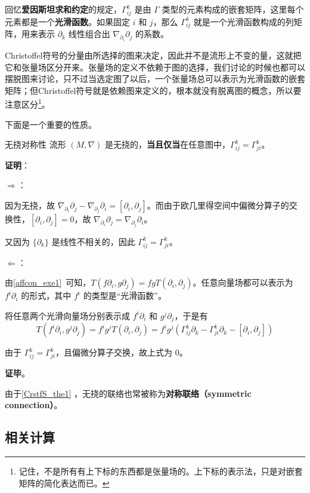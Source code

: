 回忆\textbf{爱因斯坦求和约定}的规定，$\Gamma^k_{ij}$ 是由 $\Gamma$ 类型的元素构成的嵌套矩阵，这里每个元素都是一个\textbf{光滑函数}。如果固定 $i$ 和 $j$，那么 $\Gamma^k_{ij}$ 就是一个光滑函数构成的列矩阵，用来表示 $\partial_k$ 线性组合出 $\nabla_{\partial_i}\partial_j$ 的系数。

Christoffel符号的分量由所选择的图来决定，因此并不是流形上不变的量，这就把它和张量场区分开来。张量场的定义不依赖于图的选择，我们讨论的时候也都可以摆脱图来讨论，只不过当选定图了以后，一个张量场总可以表示为光滑函数的嵌套矩阵；但Christoffel符号就是依赖图来定义的，根本就没有脱离图的概念，所以要注意区分\footnote{记住，不是所有有上下标的东西都是张量场的。上下标的表示法，只是对嵌套矩阵的简化表达而已。}。


下面是一个重要的性质。

\begin{theorem}{无挠对称性}\label{CrstfS_the1}
流形 $(M, \nabla)$ 是无挠的，\textbf{当且仅当}在任意图中，$\Gamma^k_{ij}=\Gamma^k_{ji}$。
\end{theorem}

\textbf{证明}：

$\Rightarrow$：

因为无挠，故 $\nabla_{\partial_i}\partial_j-\nabla_{\partial_j}\partial_i=[\partial_i, \partial_j]$。而由于欧几里得空间中偏微分算子的交换性，$[\partial_i, \partial_j]=0$，故 $\nabla_{\partial_i}\partial_j=\nabla_{\partial_j}\partial_i$。

又因为 $\{\partial_k\}$ 是线性不相关的，因此 $\Gamma^k_{ij}=\Gamma^k_{ji}$。

$\Leftarrow$：

由\autoref{affcon_exe1}~可知，$T(f\partial_i, g\partial_j)=fgT(\partial_i, \partial_j)$。任意向量场都可以表示为 $f^i\partial_i$ 的形式，其中 $f^i$ 的类型是“光滑函数”。

将任意两个光滑向量场分别表示成 $f^i\partial_i$ 和 $g^j\partial_j$，于是有
\begin{equation}
T(f^i\partial_i, g^j\partial_j)=f^ig^jT(\partial_i, \partial_j)=f^ig^j(\Gamma^k_{ij}\partial_k-\Gamma^k_{ji}\partial_k-[\partial_i, \partial_j])
\end{equation}

由于 $\Gamma^k_{ij}=\Gamma^k_{ji}$，且偏微分算子交换，故上式为 $0$。

\textbf{证毕}。

由于\autoref{CrstfS_the1} ，无挠的联络也常被称为\textbf{对称联络（symmetric connection）}。


\subsection{相关计算}

